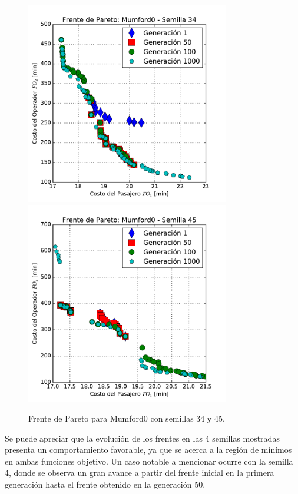 \begin{figure}[p]
\centering
\includegraphics[width=0.79\textwidth]{img/frente_Mumford0_s34}
\includegraphics[width=0.79\textwidth]{img/frente_Mumford0_s45}
\caption{Frente de Pareto para Mumford0 con semillas 34 y 45.}
\label{fig:paretoMumford2}
\end{figure}

Se puede apreciar que la evolución de los frentes en las 4 semillas mostradas presenta un comportamiento favorable, ya que se acerca a la región de mínimos en ambas funciones objetivo. Un caso notable a mencionar ocurre con la semilla 4, donde se observa un gran avance a partir del frente inicial en la primera generación hasta el frente obtenido en la generación 50.


